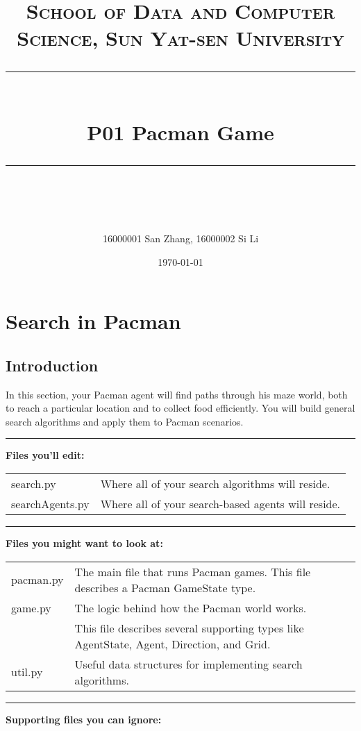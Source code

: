 \documentclass[a4paper, 11pt]{article}
\title{	
\normalfont \normalsize
\textsc{School of Data and Computer Science, Sun Yat-sen University} \\ [25pt] %
\rule{\textwidth}{0.5pt} \\[0.4cm] %
\huge  P01 Pacman Game \\ %
\rule{\textwidth}{2pt} \\[0.5cm] %
\author{16000001 San Zhang, 16000002 Si Li}
\date{\normalsize\today}
}
\begin{document}
\maketitle
\tableofcontents
\newpage
\section{Search in Pacman}
\subsection{Introduction}
In this section, your Pacman agent will find paths through his maze world, both to reach a particular location and to collect food efficiently. You will build general search algorithms and apply them to Pacman scenarios.

\rule{\textwidth}{0.5pt}

\textbf{Files you'll edit:}

\begin{tabular}{ll}
  \textsf{search.py} &  Where all of your search algorithms will reside.\\
  \textsf{searchAgents.py} & Where all of your search-based agents will reside.
\end{tabular}

\rule{\textwidth}{0.5pt}

\textbf{Files you might want to look at:}

\begin{tabular}{ll}
  \textsf{pacman.py} & The main file that runs Pacman games. This file describes a Pacman GameState type.\\
  \textsf{game.py} &	The logic behind how the Pacman world works.\\
  & This file describes several supporting types like AgentState, Agent, Direction, and Grid.\\
  \textsf{util.py} &	Useful data structures for implementing search algorithms.
\end{tabular}

\rule{\textwidth}{0.5pt}

\textbf{Supporting files you can ignore:}
\end{document}
